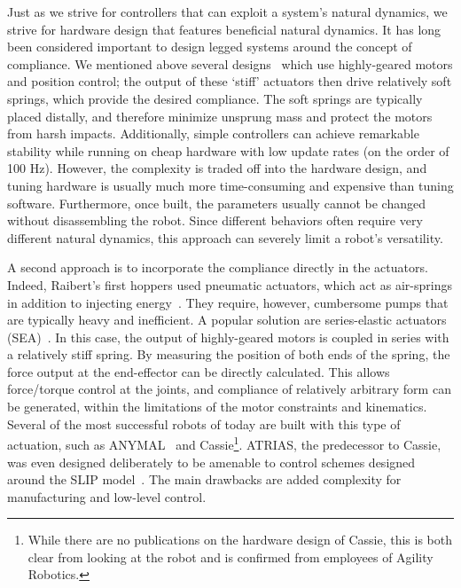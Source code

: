 Just as we strive for controllers that can exploit a system's natural dynamics, we strive for hardware design that features beneficial natural dynamics.
It has long been considered important to design legged systems around the concept of compliance.
We mentioned above several designs~\cite{sprowitz2013towards,buchli2006resonance,altendorfer2001rhex,owaki2013simple} which use highly-geared motors and position control; the output of these `stiff' actuators then drive relatively soft springs, which provide the desired compliance. The soft springs are typically placed distally, and therefore minimize unsprung mass and protect the motors from harsh impacts. Additionally, simple controllers can achieve remarkable stability while running on cheap hardware with low update rates (on the order of 100 Hz). However, the complexity is traded off into the hardware design, and tuning hardware is usually much more time-consuming and expensive than tuning software. Furthermore, once built, the parameters usually cannot be changed without disassembling the robot. Since different behaviors often require very different natural dynamics, this approach can severely limit a robot's versatility. \par
A second approach is to incorporate the compliance directly in the actuators. Indeed, Raibert's first hoppers used pneumatic actuators, which act as air-springs in addition to injecting energy~\cite{raibert1986legged}. They require, however, cumbersome pumps that are typically heavy and inefficient.
A popular solution are series-elastic actuators (SEA)~\cite{pratt1995series}. In this case, the output of highly-geared motors is coupled in series with a relatively stiff spring. By measuring the position of both ends of the spring, the force output at the end-effector can be directly calculated. This allows force/torque control at the joints, and compliance of relatively arbitrary form can be generated, within the limitations of the motor constraints and kinematics. Several of the most successful robots of today are built with this type of actuation, such as ANYMAL~\cite{hutter2016anymal} and Cassie\footnote{While there are no publications on the hardware design of Cassie, this is both clear from looking at the robot and is confirmed from employees of Agility Robotics.}. ATRIAS, the predecessor to Cassie, was even designed deliberately to be amenable to control schemes designed around the SLIP model~\cite{hubicki2016atrias}. The main drawbacks are added complexity for manufacturing and low-level control.
\par
